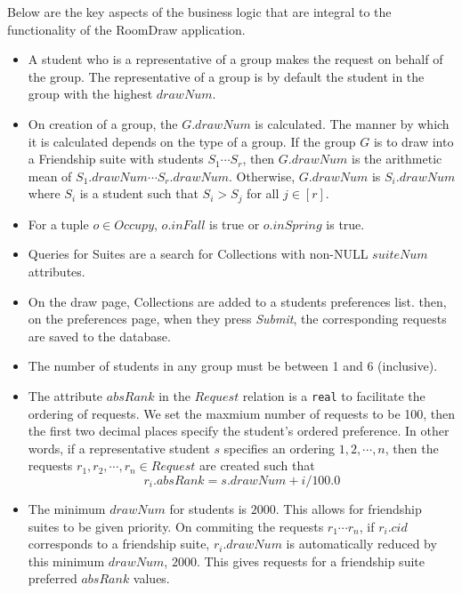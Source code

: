 \documentclass{article}
\begin{document}
\noindent Below are the key aspects of the business logic that are integral to the functionality of the RoomDraw application.

\begin{itemize}
\item A student who is a representative of a group makes the request on behalf of the group. The representative of a group is by default the student in the group with the highest $drawNum$.

\item On creation of a group, the $G.drawNum$ is calculated. The manner by which it is calculated depends on the type of a group.  If the group $G$ is to draw into a Friendship suite with students $S_1 \cdots S_r$, then $G.drawNum$ is the arithmetic mean of $S_1.drawNum \cdots S_r.drawNum$. Otherwise, $G.drawNum$ is $S_i.drawNum$ where $S_i$ is a student such that $S_i > S_j$ for all $j \in [r]$.

\item For a tuple $o \in Occupy$, $o.inFall$ is true or $o.inSpring$ is true.

\item Queries for Suites are a search for Collections with non-NULL $suiteNum$ attributes.

\item On the draw page, Collections are added to a students preferences list.  then, on the preferences page, when they press \textit{Submit}, the corresponding requests are saved to the database.

\item The number of students in any group must be between 1 and 6 (inclusive).

\item The attribute $absRank$ in the $Request$ relation is a \texttt{real} to facilitate the ordering of requests.  We set the maxmium number of requests to be 100, then the first two decimal places specify the student's ordered preference. In other words, if a representative student $s$ specifies an ordering $1,2,\cdots, n$, then the requests $r_1,r_2, \cdots, r_n \in Request$ are created such that \[r_i.absRank = s.drawNum + i/100.0\]

\item The minimum $drawNum$ for students is $2000$. This allows for friendship suites to be given priority. On commiting the requests $r_1\cdots r_n$, if $r_i.cid$ corresponds to a friendship suite, $r_i.drawNum$ is automatically reduced by this minimum $drawNum$, $2000$. This gives requests for a friendship suite preferred $absRank$ values.

\end{itemize}
\end{document}
